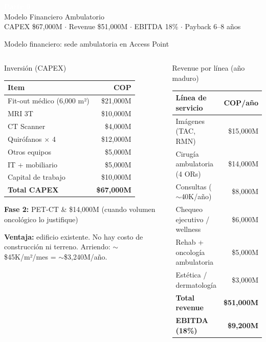 \documentclass[aspectratio=169, 11pt]{beamer}
\begin{document}
{
\begin{frame}[plain]
\vfill
\begin{center}
{\Huge\bfseries\textcolor{white}{Parte 9}}\\[8pt]
{\Large\textcolor{white!85}{Modelo Financiero Ambulatorio}}\\[12pt]
{\normalsize\textcolor{white!60}{CAPEX \$67,000M $\cdot$ Revenue \$51,000M $\cdot$ EBITDA 18\% $\cdot$ Payback 6--8 años}}
\end{center}
\vfill
\end{frame}
}

\begin{frame}{Modelo financiero: sede ambulatoria en Access Point}
\begin{columns}[T]
\begin{block}{\small Inversión (CAPEX)}
\scriptsize
\begin{tabular}{@{}lr@{}}
\toprule
\textbf{Item} & \textbf{COP} \\
\midrule
Fit-out médico (6,000 m²) & \$21,000M \\
MRI 3T & \$10,000M \\
CT Scanner & \$4,000M \\
Quirófanos $\times$ 4 & \$12,000M \\
Otros equipos & \$5,000M \\
IT + mobiliario & \$5,000M \\
Capital de trabajo & \$10,000M \\
\midrule
\textbf{Total CAPEX} & \textbf{\$67,000M} \\
\bottomrule
\end{tabular}

\vspace{2pt}
{\tiny\textbf{Fase 2:} PET-CT \& \$14,000M (cuando volumen oncológico lo justifique)}

\vspace{1pt}
{\tiny\textbf{Ventaja:} edificio existente. No hay costo de construcción ni terreno. Arriendo: $\sim$\$45K/m²/mes = $\sim$\$3,240M/año.}
\end{block}

\begin{exampleblock}{\small Revenue por línea (año maduro)}
\scriptsize
\begin{tabular}{@{}lr@{}}
\toprule
\textbf{Línea de servicio} & \textbf{COP/año} \\
\midrule
Imágenes (TAC, RMN) & \$15,000M \\
Cirugía ambulatoria (4 ORs) & \$14,000M \\
Consultas ($\sim$40K/año) & \$8,000M \\
Chequeo ejecutivo / wellness & \$6,000M \\
Rehab + oncología ambulatoria & \$5,000M \\
Estética / dermatología & \$3,000M \\
\midrule
\textbf{Total revenue} & \textbf{\$51,000M} \\
\textbf{EBITDA (18\%)} & \textbf{\$9,200M} \\
\bottomrule
\end{tabular}


\end{exampleblock}
\end{columns}
\end{frame}
\end{document}
